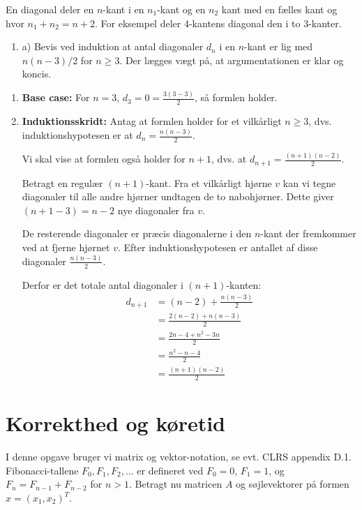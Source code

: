 \documentclass{article}
\theoremstyle{definition}
\begin{document}
En diagonal deler en $n$-kant i en $n_1$-kant og en $n_2$ kant med en fælles kant og hvor $n_1 + n_2 = n + 2$. For eksempel deler 4-kantens diagonal den i to 3-kanter.

\begin{enumerate}
    \item a) Bevis ved induktion at antal diagonaler $d_n$ i en $n$-kant er lig med $n(n-3)/2$ for $n \geq 3$. Der lægges vægt på, at argumentationen er klar og koncis.
\end{enumerate}

\begin{enumerate}
    \item \textbf{Base case:} For $n=3$, $d_3 = 0 = \frac{3(3-3)}{2}$, så formlen holder.
    
    \item \textbf{Induktionsskridt:} Antag at formlen holder for et vilkårligt $n \geq 3$, dvs.
    induktionshypotesen er at $d_n = \frac{n(n-3)}{2}$.
    
    Vi skal vise at formlen også holder for $n+1$, dvs. at $d_{n+1} = \frac{(n+1)(n-2)}{2}$.
    
    Betragt en regulær $(n+1)$-kant. Fra et vilkårligt hjørne $v$ kan vi tegne diagonaler til alle
    andre hjørner undtagen de to nabohjørner. Dette giver $(n+1-3) = n-2$ nye diagonaler fra $v$.
    
    De resterende diagonaler er præcis diagonalerne i den $n$-kant der fremkommer ved at fjerne
    hjørnet $v$. Efter induktionshypotesen er antallet af disse diagonaler $\frac{n(n-3)}{2}$.
    
    Derfor er det totale antal diagonaler i $(n+1)$-kanten:
    \begin{align*}
        d_{n+1} &= (n-2) + \frac{n(n-3)}{2} \\
        &= \frac{2(n-2) + n(n-3)}{2} \\
        &= \frac{2n-4 + n^2-3n}{2} \\
        &= \frac{n^2-n-4}{2} \\
        &= \frac{(n+1)(n-2)}{2}
    \end{align*}
\end{enumerate}


\section{Korrekthed og køretid}
I denne opgave bruger vi matrix og vektor-notation, se evt. CLRS appendix D.1. Fibonacci-tallene $F_0, F_1, F_2,\ldots$ er defineret ved $F_0 = 0$, $F_1 = 1$, og $F_n = F_{n-1} + F_{n-2}$ for $n > 1$. Betragt nu matricen $A$ og søjlevektorer på formen $x = (x_1, x_2)^T$.
\end{document}
